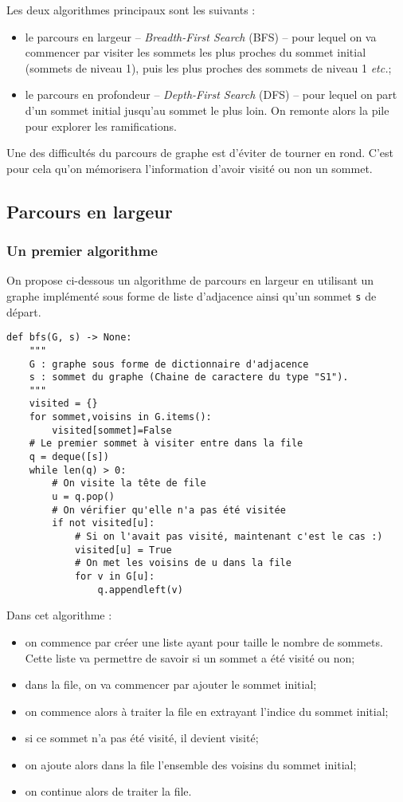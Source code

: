 Les deux algorithmes principaux sont les suivants :
\begin{itemize}
\item le parcours en largeur -- \textit{Breadth-First Search} (BFS) -- pour lequel on va commencer par visiter les sommets les plus proches du sommet initial (sommets de niveau 1), puis les plus proches des sommets de niveau 1 \textit{etc.};
\item le parcours en profondeur  -- \textit{Depth-First Search} (DFS) -- pour lequel on part d'un sommet initial jusqu'au sommet le plus loin. On remonte alors la pile pour explorer les ramifications.
\end{itemize}

Une des difficultés du parcours de graphe est d'éviter de tourner en rond. C'est pour cela qu'on mémorisera l'information d'avoir visité ou non un sommet. 

\subsection{Parcours en largeur}

\subsubsection{Un premier algorithme}
On propose ci-dessous un algorithme de parcours en largeur en utilisant un graphe implémenté sous forme de liste d'adjacence ainsi qu'un sommet \texttt{s} de départ. 

\begin{lstlisting}
def bfs(G, s) -> None:
    """
    G : graphe sous forme de dictionnaire d'adjacence
    s : sommet du graphe (Chaine de caractere du type "S1").
    """
    visited = {}
    for sommet,voisins in G.items():
        visited[sommet]=False
    # Le premier sommet à visiter entre dans la file
    q = deque([s])
    while len(q) > 0:
        # On visite la tête de file
        u = q.pop()
        # On vérifier qu'elle n'a pas été visitée
        if not visited[u]:
            # Si on l'avait pas visité, maintenant c'est le cas :)
            visited[u] = True            
            # On met les voisins de u dans la file
            for v in G[u]:
                q.appendleft(v)
\end{lstlisting}

Dans cet algorithme : 
\begin{itemize}
\item on commence par créer une liste ayant pour taille le nombre de sommets. Cette liste va permettre de savoir si un sommet a été visité ou non;
\item dans la file, on va commencer par ajouter le sommet initial;
\item on commence alors à traiter la file en extrayant l'indice du sommet initial;
\item si ce sommet n'a pas été visité, il devient visité;
\item on ajoute alors dans la file l'ensemble des voisins du sommet initial;
\item on continue alors de traiter la file. 
\end{itemize}

